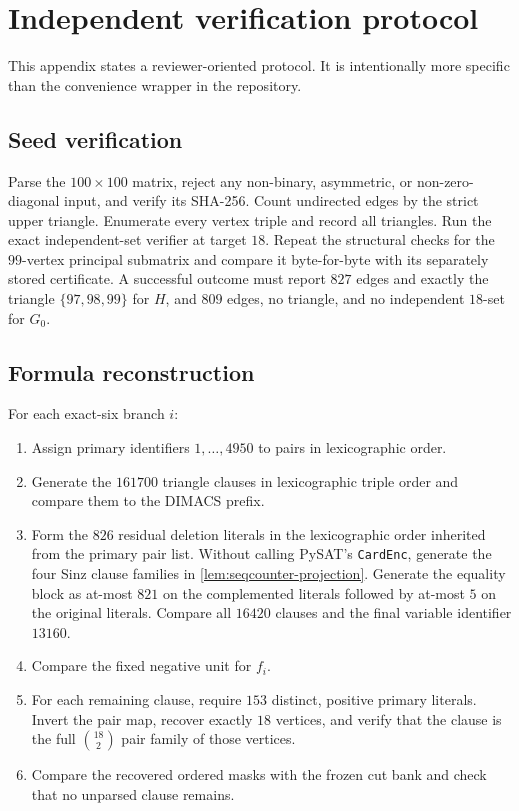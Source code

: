 \section{Independent verification protocol}\label{app:protocol}

This appendix states a reviewer-oriented protocol.  It is intentionally more
specific than the convenience wrapper in the repository.

\subsection{Seed verification}

Parse the \(100\times100\) matrix, reject any non-binary, asymmetric, or
non-zero-diagonal input, and verify its SHA-256.  Count undirected edges by the
strict upper triangle.  Enumerate every vertex triple and record all
triangles.  Run the exact independent-set verifier at target \(18\).  Repeat
the structural checks for the \(99\)-vertex principal submatrix and compare it
byte-for-byte with its separately stored certificate.  A successful outcome
must report \(827\) edges and exactly the triangle \(\{97,98,99\}\) for \(H\),
and \(809\) edges, no triangle, and no independent \(18\)-set for \(G_0\).

\subsection{Formula reconstruction}

For each exact-six branch \(i\):
\begin{enumerate}[label=\arabic*.]
\item Assign primary identifiers \(1,\ldots,4950\) to pairs in lexicographic
order.
\item Generate the \(161700\) triangle clauses in lexicographic triple order
and compare them to the DIMACS prefix.
\item Form the \(826\) residual deletion literals in the lexicographic order
inherited from the primary pair list.  Without calling PySAT's
\texttt{CardEnc}, generate the four Sinz clause families in
\cref{lem:seqcounter-projection}.  Generate the equality block as at-most
\(821\) on the complemented literals followed by at-most \(5\) on the
original literals.  Compare all \(16420\) clauses and the final variable
identifier \(13160\).
\item Compare the fixed negative unit for \(f_i\).
\item For each remaining clause, require \(153\) distinct, positive primary
literals.  Invert the pair map, recover exactly \(18\) vertices, and verify
that the clause is the full \(\binom{18}{2}\) pair family of those vertices.
\item Compare the recovered ordered masks with the frozen cut bank and check
that no unparsed clause remains.
\end{enumerate}

